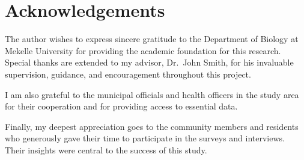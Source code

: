 
\chapter*{Acknowledgements}
The author wishes to express sincere gratitude to the Department of Biology at Mekelle University for providing the academic foundation for this research. Special thanks are extended to my advisor, Dr.~John Smith, for his invaluable supervision, guidance, and encouragement throughout this project.

I am also grateful to the municipal officials and health officers in the study area for their cooperation and for providing access to essential data.

Finally, my deepest appreciation goes to the community members and residents who generously gave their time to participate in the surveys and interviews. Their insights were central to the success of this study.
